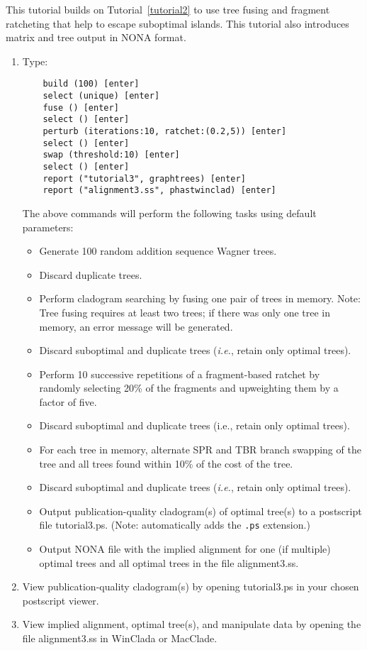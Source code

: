 This tutorial builds on Tutorial~\ref{tutorial2} to use tree fusing and fragment ratcheting 
that help to escape suboptimal islands. This tutorial also introduces matrix and 
tree output in NONA format.

\begin{enumerate}
\item Type: 
\begin{verbatim}
    build (100) [enter]
    select (unique) [enter]
    fuse () [enter]
    select () [enter]
    perturb (iterations:10, ratchet:(0.2,5)) [enter]
    select () [enter]
    swap (threshold:10) [enter]
    select () [enter]
    report ("tutorial3", graphtrees) [enter]
    report ("alignment3.ss", phastwinclad) [enter]
\end{verbatim}

The above commands will perform the following tasks using default parameters:
\begin{itemize}
\item Generate 100 random addition sequence Wagner trees.
\item Discard duplicate trees.
\item Perform cladogram searching by fusing one pair of trees in memory. Note: Tree 
fusing requires at least two trees; if there was only one tree in memory, 
an error message will be generated. 
\item Discard suboptimal and duplicate trees (\emph{i.e.}, retain only optimal trees).
\item Perform 10 successive repetitions of a fragment-based ratchet by randomly 
selecting 20\% of the fragments and upweighting them by a factor of five.
\item Discard suboptimal and duplicate trees (i.e., retain only optimal trees).
\item For each tree in memory, alternate SPR and TBR branch swapping of the tree 
and all trees found within 10\% of the cost of the tree.
\item Discard suboptimal and duplicate trees (\emph{i.e.}, retain only optimal trees).
\item Output publication-quality cladogram(s) of optimal tree(s) to a postscript 
file tutorial3.ps. (Note: \poy automatically adds the \texttt{.ps} extension.)
\item Output NONA file with the implied alignment for one (if multiple) optimal 
trees and all optimal trees in the file alignment3.ss.
\end{itemize}

\item View publication-quality cladogram(s) by opening tutorial3.ps in your chosen 
postscript viewer.
\item View implied alignment, optimal tree(s), and manipulate data by opening the 
file alignment3.ss in WinClada or MacClade.

\end{enumerate}

